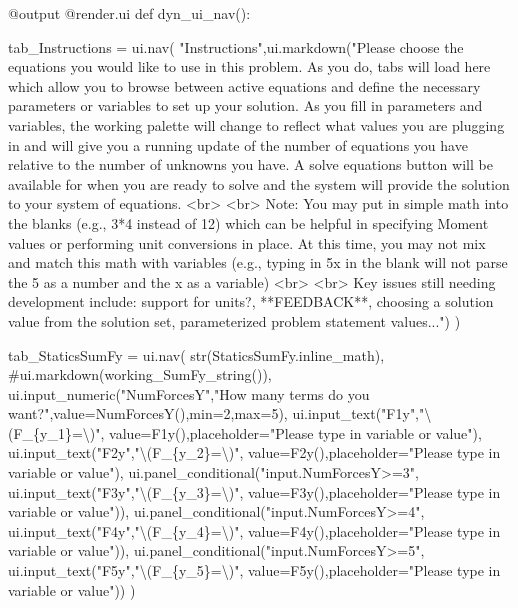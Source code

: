 \documentclass[
  letterpaper,
  DIV=11,
  numbers=noendperiod]{scrreprt}
\newenvironment{Shaded}{\begin{snugshade}}{\end{snugshade}}
\newcommand{\NormalTok}[1]{\textcolor[rgb]{0.00,0.23,0.31}{#1}}
\begin{document}
\begin{Shaded}
\begin{Highlighting}[]
\NormalTok{    @output}
\NormalTok{    @render.ui}
\NormalTok{    def dyn\_ui\_nav():}
      
\NormalTok{        tab\_Instructions = ui.nav(}
\NormalTok{            "Instructions",ui.markdown("Please choose the equations you would like to use in this problem. As you do, tabs will load here which allow you to browse between active equations and define the necessary parameters or variables to set up your solution. As you fill in parameters and variables, the working palette will change to reflect what values you are plugging in and will give you a running update of the number of equations you have relative to the number of unknowns you have. A solve equations button will be available for when you are ready to solve and the system will provide the solution to your system of equations. \textless{}br\textgreater{} \textless{}br\textgreater{} Note: You may put in simple math into the blanks (e.g., 3*4 instead of 12) which can be helpful in specifying Moment values or performing unit conversions in place. At this time, you may not mix and match this math with variables (e.g., typing in 5x in the blank will not parse the 5 as a number and the x as a variable) \textless{}br\textgreater{} \textless{}br\textgreater{} Key issues still needing development include: support for units?, **FEEDBACK**, choosing a solution value from the solution set, parameterized problem statement values...") }
\NormalTok{        )}
    
\NormalTok{        tab\_StaticsSumFy = ui.nav(}
\NormalTok{                str(StaticsSumFy.inline\_math),}
\NormalTok{                \#ui.markdown(working\_SumFy\_string()),}
\NormalTok{                ui.input\_numeric("NumForcesY","How many terms do you want?",value=NumForcesY(),min=2,max=5),}
\NormalTok{                ui.input\_text("F1y","\textbackslash{}(F\_\{y\_1\}=\textbackslash{})", value=F1y(),placeholder="Please type in variable or value"),}
\NormalTok{                ui.input\_text("F2y","\textbackslash{}(F\_\{y\_2\}=\textbackslash{})", value=F2y(),placeholder="Please type in variable or value"),}
\NormalTok{                ui.panel\_conditional("input.NumForcesY\textgreater{}=3", ui.input\_text("F3y","\textbackslash{}(F\_\{y\_3\}=\textbackslash{})", value=F3y(),placeholder="Please type in variable or value")),}
\NormalTok{                ui.panel\_conditional("input.NumForcesY\textgreater{}=4", ui.input\_text("F4y","\textbackslash{}(F\_\{y\_4\}=\textbackslash{})", value=F4y(),placeholder="Please type in variable or value")),}
\NormalTok{                ui.panel\_conditional("input.NumForcesY\textgreater{}=5", ui.input\_text("F5y","\textbackslash{}(F\_\{y\_5\}=\textbackslash{})", value=F5y(),placeholder="Please type in variable or value"))}
\NormalTok{                )}
        

\end{Highlighting}
\end{Shaded}
\end{document}
